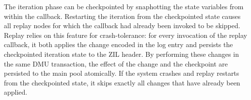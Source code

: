 \documentclass[12pt,a4paper,twoside]{book}
\begin{document}



The iteration phase can be checkpointed by snaphotting the state variables from within the callback.
Restarting the iteration from the checkpointed state causes all replay nodes for which the callback had already been invoked to be skipped.
Replay relies on this feature for crash-tolerance: for every invocation of the replay callback, it both applies the change encoded in the log entry and persists the checkpointed iteration state to the ZIL header.
By performing these changes in the same DMU transaction, the effect of the change and the checkpoint are persisted to the main pool atomically.
If the system crashes and replay restarts from the checkpointed state, it skips exactly all changes that have already been applied.
\end{document}
